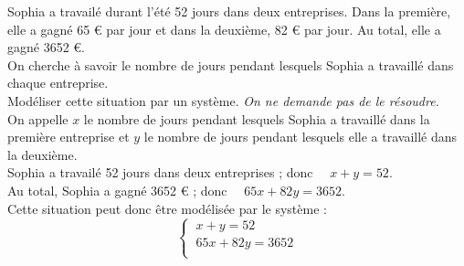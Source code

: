 \documentclass[a4paper,11pt,exos]{nsi}
\begin{document}
\maketitle
\exo{}
{
    \def\xmin{-5}	\def\xmax{7}	\def\ymin{-5}	\def\ymax{7}
}

\exo{} 
\textcolor{UGLiBlue}{Sophia a travailé durant l'été 52 jours dans deux entreprises. Dans la première, elle a gagné 65 € par jour et dans la deuxième, 82 € par jour. Au total, elle a gagné 3652 €.\\
On cherche à savoir le nombre de jours pendant lesquels Sophia a travaillé dans chaque entreprise.\\[.5em]
Modéliser cette situation par un système. \textit{On ne demande pas de le résoudre.}}\\

On appelle $x$ le nombre de jours pendant lesquels Sophia a travaillé dans la première entreprise et $y$ le nombre de jours pendant lesquels elle a travaillé dans la deuxième.\\[.5em]
Sophia a travailé 52 jours dans deux entreprises ; donc $\quad x+y=52$.\\[.5em]
Au total, Sophia a gagné 3652 € ; donc $\quad 65x+82y=3652$.\\[.5em]
Cette situation peut donc être modélisée par le système :
$$\left\{
			\begin{array}{l}
				\ x+y=52 \\
				\ 65x+82y=3652 \\
			\end{array} \right.$$
\end{document}
